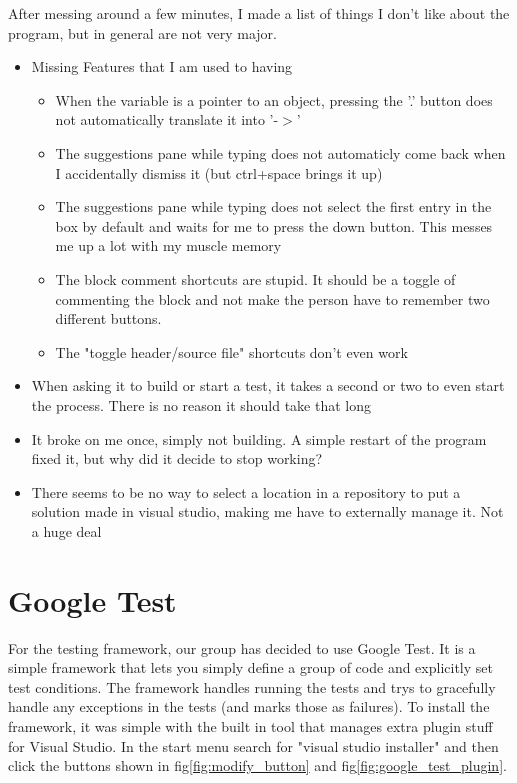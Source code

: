 \documentclass[12pt]{article}
\begin{document}
After messing around a few minutes, I made a list of things I don't like about the program, but in general are not very major.
\begin{itemize}
	\item Missing Features that I am used to having
	\begin{itemize}
		\item When the variable is a pointer to an object, pressing the '.' button does not automatically translate it into '-$>$'
		\item The suggestions pane while typing does not automaticly come back when I accidentally dismiss it (but ctrl+space brings it up)
		\item The suggestions pane while typing does not select the first entry in the box  by default and waits for me to press the down button. This messes me up a lot with my muscle memory
		\item The block comment shortcuts are stupid. It should be a toggle of commenting the block and not make the person have to remember two different buttons.
		\item The "toggle header/source file" shortcuts don't even work
	\end{itemize}
	\item When asking it to build or start a test, it takes a second or two to even start the process. There is no reason it should take that long
	\item It broke on me once, simply not building. A simple restart of the program fixed it, but why did it decide to stop working?
	\item There seems to be no way to select a location in a repository to put a solution made in visual studio, making me have to externally manage it. Not a huge deal
\end{itemize}

\section{Google Test}

For the testing framework, our group has decided to use Google Test.
It is a simple framework that lets you simply define a group of code and explicitly set test conditions.
The framework handles running the tests and trys to gracefully handle any exceptions in the tests (and marks those as failures).
To install the framework, it was simple with the built in tool that manages extra plugin stuff for Visual Studio.
In the start menu search for "visual studio installer" and then click the buttons shown in fig\ref{fig:modify_button} and fig\ref{fig:google_test_plugin}.
\end{document}
